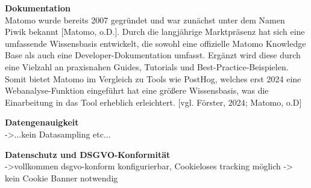 \textbf{Dokumentation} \\
Matomo wurde bereits 2007 gegründet und war zunächst unter dem Namen Piwik bekannt [Matomo, o.D.]. Durch die langjährige Marktpräsenz hat sich eine umfassende Wissensbasis entwickelt, die sowohl eine offizielle Matomo Knowledge Base als auch eine Developer-Dokumentation umfasst. Ergänzt wird diese durch eine Vielzahl an praxisnahen Guides, Tutorials und Best-Practice-Beispielen. Somit bietet Matomo im Vergleich zu Tools wie PostHog, welches erst 2024 eine Webanalyse-Funktion eingeführt hat eine größere Wissensbasis, was die Einarbeitung in das Tool erheblich erleichtert. [vgl. Förster, 2024; Matomo, o.D]

\textbf{Datengenauigkeit} \\
->...kein Datasampling etc...

\textbf{Datenschutz und DSGVO-Konformität} \\
->vollkommen dsgvo-konform konfigurierbar, Cookieloses tracking möglich -> kein Cookie Banner notwendig